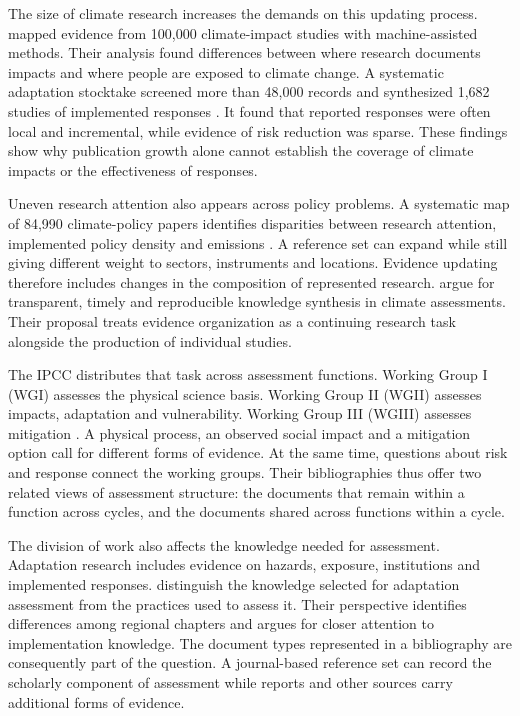 \documentclass[11pt,a4paper]{article}
\begin{document}
The size of climate research increases the demands on this updating process. \citet{callaghan2021evidence} mapped evidence from 100,000 climate-impact studies with machine-assisted methods. Their analysis found differences between where research documents impacts and where people are exposed to climate change. A systematic adaptation stocktake screened more than 48,000 records and synthesized 1,682 studies of implemented responses \citep{berrangford2021stocktake}. It found that reported responses were often local and incremental, while evidence of risk reduction was sparse. These findings show why publication growth alone cannot establish the coverage of climate impacts or the effectiveness of responses.

Uneven research attention also appears across policy problems. A systematic map of 84,990 climate-policy papers identifies disparities between research attention, implemented policy density and emissions \citep{callaghan2025policymap}. A reference set can expand while still giving different weight to sectors, instruments and locations. Evidence updating therefore includes changes in the composition of represented research. \citet{ford2025syntheses} argue for transparent, timely and reproducible knowledge synthesis in climate assessments. Their proposal treats evidence organization as a continuing research task alongside the production of individual studies.

The IPCC distributes that task across assessment functions. Working Group I (WGI) assesses the physical science basis. Working Group II (WGII) assesses impacts, adaptation and vulnerability. Working Group III (WGIII) assesses mitigation \citep{ipcc2022wg2,ipcc2022wg3,ipcc2023synthesis}. A physical process, an observed social impact and a mitigation option call for different forms of evidence. At the same time, questions about risk and response connect the working groups. Their bibliographies thus offer two related views of assessment structure: the documents that remain within a function across cycles, and the documents shared across functions within a cycle.

The division of work also affects the knowledge needed for assessment. Adaptation research includes evidence on hazards, exposure, institutions and implemented responses. \citet{nalau2024assessment} distinguish the knowledge selected for adaptation assessment from the practices used to assess it. Their perspective identifies differences among regional chapters and argues for closer attention to implementation knowledge. The document types represented in a bibliography are consequently part of the question. A journal-based reference set can record the scholarly component of assessment while reports and other sources carry additional forms of evidence.
\end{document}
